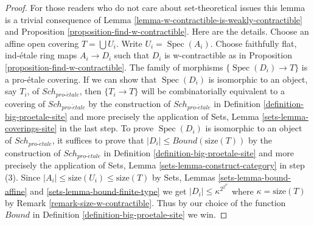 \documentclass[10pt,a4paper]{amsart}
\theoremstyle{plain}
\theoremstyle{definition}
\theoremstyle{remark}
\numberwithin{equation}{subsection}
\def\Spec{\mathop{\mathrm{Spec}}}
\def\Sch{\mathit{Sch}}
\def\proetale{{pro\text{-}\acute{e}tale}}
\begin{document}
\begin{proof}
For those readers who do not care about set-theoretical issues
this lemma is a trivial consequence of
Lemma \ref{lemma-w-contractible-is-weakly-contractible} and
Proposition \ref{proposition-find-w-contractible}.
Here are the details.
Choose an affine open covering $T = \bigcup U_i$. Write $U_i = \Spec(A_i)$.
Choose faithfully flat, ind-\'etale ring maps $A_i \to D_i$
such that $D_i$ is w-contractible as in
Proposition \ref{proposition-find-w-contractible}.
The family of morphisms $\{\Spec(D_i) \to T\}$ is a
pro-\'etale covering.
If we can show that $\Spec(D_i)$ is isomorphic to an object, say $T_i$,
of $\Sch_\proetale$, then $\{T_i \to T\}$ will be combinatorially
equivalent to a covering of $\Sch_\proetale$ by the construction
of $\Sch_\proetale$ in Definition \ref{definition-big-proetale-site}
and more precisely the application of
Sets, Lemma \ref{sets-lemma-coverings-site} in the last step.
To prove $\Spec(D_i)$ is isomorphic to an object of
$\Sch_\proetale$, it suffices to prove that
$|D_i| \leq Bound(\text{size}(T))$ by the construction
of $\Sch_\proetale$ in Definition \ref{definition-big-proetale-site}
and more precisely the application of
Sets, Lemma \ref{sets-lemma-construct-category} in step (3).
Since $|A_i| \leq \text{size}(U_i) \leq \text{size}(T)$
by Sets, Lemmas \ref{sets-lemma-bound-affine} and
\ref{sets-lemma-bound-finite-type} we get
$|D_i| \leq \kappa^{2^{2^{2^\kappa}}}$ where $\kappa = \text{size}(T)$
by Remark \ref{remark-size-w-contractible}.
Thus by our choice of the function $Bound$ in
Definition \ref{definition-big-proetale-site} we win.
\end{proof}
\end{document}
